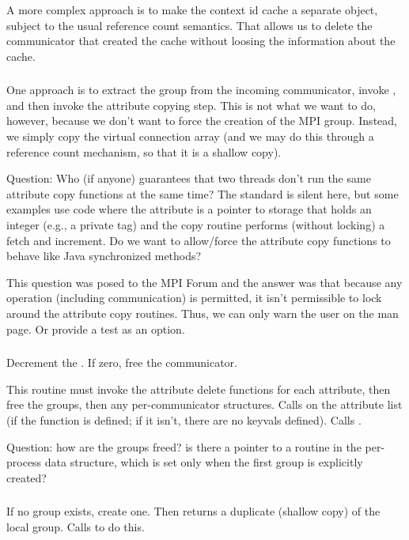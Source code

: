 \documentclass{article}
\begin{document}
A more complex approach is to make the context id cache a separate
object, subject to the usual reference count semantics.  That allows
us to delete the communicator that created the cache without loosing
the information about the cache.

\subsubsection{}
One approach is to extract the group from the incoming communicator,
invoke , and then invoke the attribute
copying step.  This is not what we want to do, however, because we
don't want to force the creation of the MPI group.  Instead, we simply
copy the virtual connection array (and we may do this through a
reference count mechanism, so that it is a shallow copy).

Question: Who (if anyone) guarantees that two threads don't run the same
attribute copy functions at the same time?  The standard is silent here, but
some examples use code where the attribute is a pointer to storage that holds
an integer (e.g., a private tag) and the copy routine performs (without
locking) a fetch and increment.  Do we want to allow/force the attribute copy
functions to behave like Java synchronized methods?

This question was posed to the MPI Forum and the answer was that
because any operation (including communication) is permitted, it isn't
permissible to lock around the attribute copy routines.  Thus, we can
only warn the user on the man page.  Or provide a test as an option.

\subsubsection{}
Decrement the .  If zero, free the
communicator.

This routine must invoke the attribute delete functions for each
attribute, then free the groups, then any per-communicator
structures.  
Calls  on the attribute list (if
the function is defined; if it isn't, there are no keyvals defined).
Calls .

Question: how are the groups freed?  is there a pointer to a
 routine in the per-process data structure, which is
set only when the first group is explicitly created?

\subsubsection{}
If no group exists, create one.  Then 
returns a duplicate (shallow copy) of the local group.  Calls
 to do this. 
\end{document}
